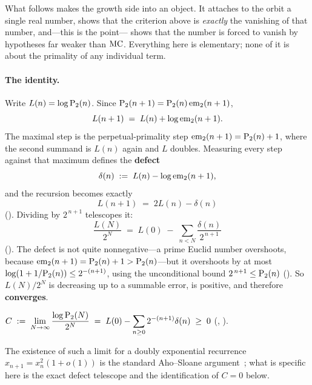 \smallskip\noindent
What follows makes the growth side into an object.  It attaches to the
orbit a single real number, shows that the criterion above is
\emph{exactly} the vanishing of that number, and---this is the point---%
shows that the number is forced to vanish by hypotheses far weaker than
$\mathrm{MC}$.  Everything here is elementary; none of it is about the primality of
any individual term.

\paragraph{The identity.}
Write $L(n) = \log \mathrm{P}_{2}(n)$.  Since
$\mathrm{P}_{2}(n+1) = \mathrm{P}_{2}(n)\,\mathrm{em}_{2}(n+1)$,
\[
  L(n+1) \;=\; L(n) + \log \mathrm{em}_{2}(n+1).
\]
The maximal step is the perpetual-primality step
$\mathrm{em}_{2}(n+1) = \mathrm{P}_{2}(n)+1$, where the second summand is $L(n)$ again
and $L$ doubles.  Measuring every step against that maximum defines the
\textbf{defect}
\[
  \delta(n) \;:=\; L(n) - \log \mathrm{em}_{2}(n+1),
\]
and the recursion becomes exactly
\[
  L(n+1) \;=\; 2L(n) - \delta(n)
\]
().
Dividing by $2^{\,n+1}$ telescopes it:
\begin{equation}
\label{eq:defect-telescope}
  \frac{L(N)}{2^{N}}
  \;=\; L(0) \;-\; \sum_{n<N} \frac{\delta(n)}{2^{\,n+1}}
\end{equation}
().
The defect is not quite nonnegative---a prime Euclid number overshoots,
because $\mathrm{em}_{2}(n+1) = \mathrm{P}_{2}(n)+1 > \mathrm{P}_{2}(n)$---but it overshoots
by at most $\log(1 + 1/\mathrm{P}_{2}(n)) \leq 2^{-(n+1)}$, using the
unconditional bound $2^{\,n+1} \leq \mathrm{P}_{2}(n)$
().  So
$L(N)/2^{N}$ is decreasing up to a summable error, is positive, and
therefore \textbf{converges}.

\begin{definition}
\label{def:growth-constant}
$C \;:=\; \displaystyle\lim_{N\to\infty} \frac{\log \mathrm{P}_{2}(N)}{2^{N}}
 \;=\; L(0) - \sum_{n\geq 0} 2^{-(n+1)}\delta(n) \;\geq\; 0$
(,
 ).
\end{definition}
\noindent The existence of such a limit for a doubly exponential
recurrence $x_{n+1} = x_n^2(1+o(1))$ is the standard Aho--Sloane
argument~\cite{AhoSloane1973}; what is specific here is the exact
defect telescope and the identification of $C = 0$ below.

